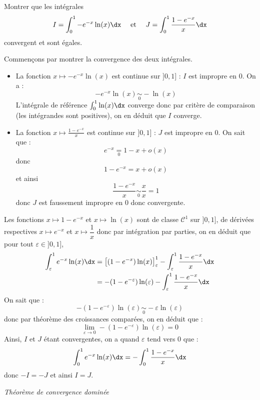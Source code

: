 \documentclass[a4paper,10pt]{report}
\begin{document}
\begin{Exa} Montrer que les intégrales 
$$ I=\int_{0}^1 -e^{-x} \ln(x) \dx \quad \hbox{ et } \quad J= \int_{0}^1 \frac{1-e^{-x}}{x} \dx$$
convergent et sont égales.
\end{Exa}

\corr Commençons par montrer la convergence des deux intégrales.

\begin{itemize}
\item La fonction $x \mapsto -e^{-x} \ln(x)$ est continue sur $]0,1]$ : $I$ est impropre en $0$. On a :
$$  -e^{-x} \ln(x) \underset{0}{\sim} -\ln(x)$$
L'intégrale de référence $\int_0^1 \ln(x) \dx$ converge donc par critère de comparaison (les intégrandes sont positives), on en déduit que $I$ converge.
\item La fonction $x \mapsto \frac{1-e^{-x}}{x}$ est continue sur $]0,1]$ : $J$ est impropre en $0$. On sait que :
$$ e^{-x} \underset{0}{=} 1-x + o(x) $$
donc 
$$ 1-e^{-x} = x + o(x)$$
et ainsi 
$$ \frac{1-e^{-x}}{x} \underset{0}{\sim} \dfrac{x}{x}= 1$$
donc $J$ est faussement impropre en $0$ donc convergente.
\end{itemize}
 Les fonctions $x \mapsto 1-e^{-x}$ et $x \mapsto \ln(x)$ sont de classe $\mathcal{C}^1$ sur $]0,1]$, de dérivées respectives $x \mapsto e^{-x}$ et $x \mapsto \dfrac{1}{x}$ donc par intégration par parties, on en déduit que pour tout $\varepsilon \in ]0,1]$,
\begin{align*}
\int_{\varepsilon}^1 e^{-x} \ln(x) \dx & = \left[(1-e^{-x}) \ln(x) \right]_{\varepsilon}^1  - \int_{\varepsilon}^1 \dfrac{1-e^{-x}}{x} \dx \\
& = - (1-e^{-\varepsilon}) \ln(\varepsilon)  - \int_{\varepsilon}^1 \dfrac{1-e^{-x}}{x} \dx \\
\end{align*}
On sait que :
$$ - (1-e^{-\varepsilon}) \ln(\varepsilon) \underset{0}{\sim} - \varepsilon \ln(\varepsilon)$$
donc par théorème des croissances comparées, on en déduit que :
$$ \lim_{\varepsilon \rightarrow 0}  - (1-e^{-\varepsilon}) \ln(\varepsilon) = 0$$
Ainsi, $I$ et $J$ étant convergentes, on a quand $\varepsilon$ tend vers $0$ que :
$$ \int_{0}^1 e^{-x} \ln(x) \dx =  - \int_{0}^1 \dfrac{1-e^{-x}}{x} \dx $$
donc $-I=-J$ et ainsi $I=J$.



\medskip

\begin{center}
\textit{{ {\large Théorème de convergence dominée}}}
\end{center}
\end{document}
